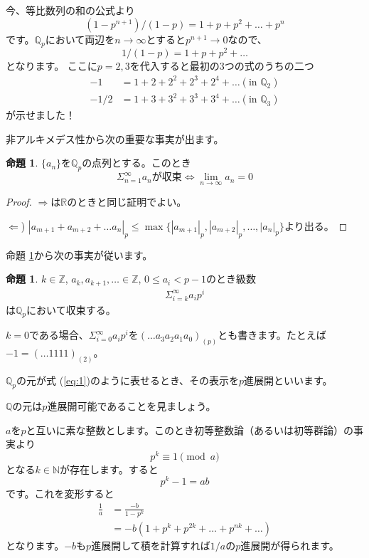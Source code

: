 \documentclass[uplatex]{jsarticle}
\newcommand{\Z}{\mathbb{Z}}
\newcommand{\Q}{\mathbb{Q}}
\newcommand{\R}{\mathbb{R}}
\theoremstyle{definition} %
\newtheorem{prop}[thm]{命題}
\begin{document}
今、等比数列の和の公式より
\[(1-p^{n+1}) / (1-p) = 1 + p + p^2 + \dots + p^n\]
です。$\Q_p$において両辺を$n \to \infty$とすると$p^{n+1} \to 0$なので、
\[1 / (1-p) = 1 + p + p^2 + \dots\]
となります。
ここに$p = 2, 3$を代入すると最初の3つの式のうちの二つ
\begin{align*}
-1 &= 1 + 2 + 2^2 + 2^3 + 2^4 + \dots (\text{in } \Q_2) \\
-1/2 &= 1 + 3 + 3^2 + 3^3 + 3^4 + \dots (\text{in } \Q_3)
\end{align*}
が示せました！

非アルキメデス性から次の重要な事実が出ます。

\begin{oframed}\begin{prop}\label{prop:3}
$\{a_n\}$を$\Q_p$の点列とする。このとき
\[\Sigma_{n=1}^\infty a_n が収束 \iff \lim_{n\to\infty} a_n = 0\]
\end{prop}\end{oframed}
\begin{proof}
$\Rightarrow$は$\R$のときと同じ証明でよい。

$\Leftarrow$) $|a_{m+1} + a_{m+2} + \dots a_n|_p \leq \max\{|a_{m+1}|_p,  |a_{m+2}|_p, \dots, |a_n|_p\}$より出る。
\end{proof}

命題 \ref{prop:3}から次の事実が従います。

\begin{oframed}\begin{prop}
$k \in \Z$, $a_k, a_{k+1}, \dots \in \Z$, $0 \le a_i < p-1$のとき級数
\begin{align}
\Sigma_{i=k}^\infty a_i p^i \label{eq:1}
\end{align}
は$\Q_p$において収束する。
\end{prop}\end{oframed}

$k=0$である場合、$\Sigma_{i=0}^\infty a_i p^i$を$(\dots a_3 a_2 a_1 a_0)_{(p)}$とも書きます。たとえば $-1 = (\dots 1 1 1 1)_{(2)}$。

$\Q_p$の元が式 (\ref{eq:1})のように表せるとき、その表示を$p$進展開といいます。

$\Q$の元は$p$進展開可能であることを見ましょう。

$a$を$p$と互いに素な整数とします。このとき初等整数論（あるいは初等群論）の事実より
\[p^k \equiv 1 \pmod a\]
となる$k \in \mathbb{N}$が存在します。すると
\[p^k-1 = ab\]
です。これを変形すると
\begin{align*}
\frac{1}{a} &= \frac{-b}{1-p^k} \\
&= -b(1+p^k+p^{2k}+\dots+p^{nk}+\dots)
\end{align*}
となります。$-b$も$p$進展開して積を計算すれば$1/a$の$p$進展開が得られます。
\end{document}
